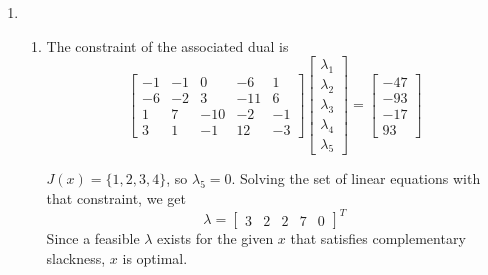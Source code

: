 \documentclass[12pt]{article}
\begin{document}
\begin{enumerate}
      \item \begin{enumerate}
                  \item The constraint of the associated dual is
                        \[\begin{bmatrix}
                                    -1 & -1 & 0   & -6  & 1  \\
                                    -6 & -2 & 3   & -11 & 6  \\
                                    1  & 7  & -10 & -2  & -1 \\
                                    3  & 1  & -1  & 12  & -3
                              \end{bmatrix} \begin{bmatrix}
                                    \lambda_1 \\ \lambda_2 \\ \lambda_3 \\ \lambda_4 \\ \lambda_5
                              \end{bmatrix} = \begin{bmatrix}
                                    -47 \\ -93 \\ -17 \\ 93
                              \end{bmatrix}\]

                        $J(x)=\{1, 2, 3, 4\}$, so $\lambda_5 = 0$.
                        Solving the set of linear equations with that constraint, we get
                        \[\lambda = \begin{bmatrix}3 & 2 & 2 & 7 & 0\end{bmatrix}^T\]
                        Since a feasible $\lambda$ exists for the given $x$
                        that satisfies complementary slackness,
                        $x$ is optimal.


\end{enumerate}
\end{enumerate}
\end{document}
